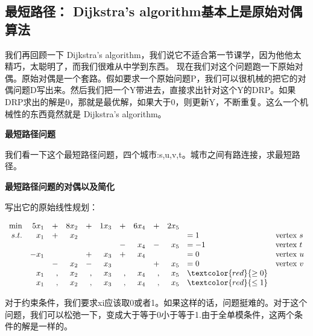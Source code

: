 \subsection{最短路径： Dijkstra's algorithm基本上是原始对偶算法}
我们再回顾一下 Dijkstra's algorithm，我们说它不适合第一节课学，因为他他太精巧，太聪明了，而我们很难从中学到东西。
现在我们对这个问题跑一下原始对偶。原始对偶是一个套路。假如要求一个原始问题P，我们可以很机械的把它的对偶问题D写出来。然后我们把一个Y带进去，直接求出针对这个Y的DRP。如果DRP求出的解是0，那就是最优解，如果大于0，则更新Y，不断重复。这么一个机械性的东西竟然就是 Dijkstra's algorithm。


\textbf{最短路径问题}

我们看一下这个最短路径问题，四个城市:s,u,v,t。城市之间有路连接，求最短路径。
\begin{figure}[H]
\end{figure}


\textbf{最短路径问题的对偶以及简化}

写出它的原始线性规划：
\begin{small}
\[
\begin{array}{rrrrrrrrrrll}
 \min &5 x_1   &+&  8 x_2   &+& 1 x_3   &+& 6 x_4   &+& 2 x_5 & \\
 s.t. & x_1 &+&  x_2 & &  & &   & & & = 1    & \text{vertex } s \\
      &     & &      & &  &-&   x_4  &-& x_5 & = -1 &\text{vertex } t  \\
      &  -x_1& &     &+& x_3 &+& x_4  & & & =  0  &\text{vertex } u \\
      &      &-& x_2 &-& x_3 & &      &+&x_5 & =  0 &\text{vertex } v  \\
      &   x_1 &,&     x_2 &,&    x_3  &,&    x_4  &,& x_5 & \textcolor{red}{\geq 0} \\
       &   x_1 &,&     x_2 &,&    x_3  &,&    x_4  &,& x_5 & \textcolor{red}{\leq 1} 	
\end{array} \nonumber
\]
\end{small}
对于约束条件，我们要求xi应该取0或者1。如果这样的话，问题挺难的。对于这个问题，我们可以松弛一下，变成大于等于0小于等于1.由于全单模条件，这两个条件的解是一样的。

